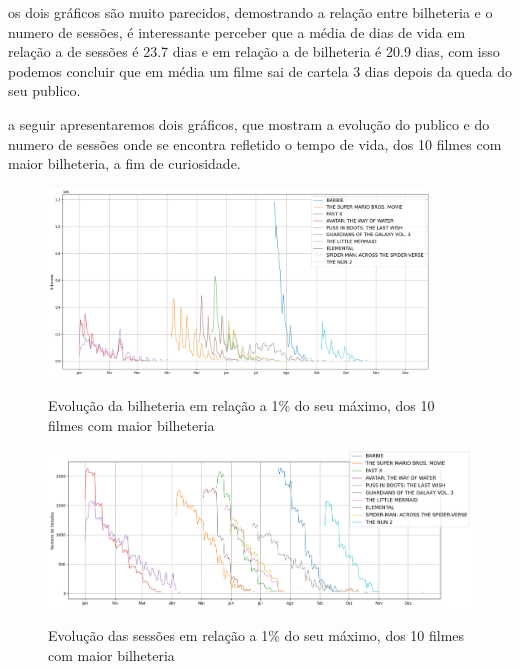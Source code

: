 \documentclass[12pt, a4paper]{article}
\begin{document}
os dois gráficos são muito parecidos, demostrando a relação entre bilheteria e o numero de sessões, é interessante perceber que a média de dias de vida em relação a de sessões é 23.7 dias e em relação a de bilheteria é 20.9 dias, com isso podemos concluir que em média um filme sai de cartela 3 dias depois da queda do seu publico.

a seguir apresentaremos dois gráficos, que mostram a evolução do publico e do numero de sessões onde se encontra refletido o tempo de vida, dos 10 filmes com maior bilheteria, a fim de curiosidade.

\begin{figure}[h]
    \centering
    \includegraphics[width=0.9\textwidth]{tempo_de_vida_por_bilheteria.png} %
    \label{fig:tempo_de_vida_por_bilheteria}
    \caption{Evolução da bilheteria em relação a 1\% do seu máximo, dos 10 filmes com maior bilheteria }
\end{figure}

\begin{figure}[h]
    \centering
    \includegraphics[width=1\textwidth]{tempo_de_vida_por_sessoes.png} %
    \label{fig:tempo_de_vida_por_sessoes}
    \caption{Evolução das sessões em relação a 1\% do seu máximo, dos 10 filmes com maior bilheteria }
\end{figure}

\newpage
\end{document}
